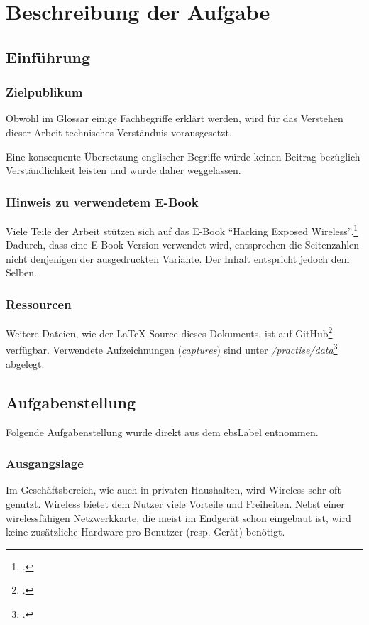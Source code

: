 \chapter{Beschreibung der Aufgabe}

\section{Einführung}
\subsection{Zielpublikum}
Obwohl im Glossar einige Fachbegriffe erklärt werden, wird für das Verstehen dieser Arbeit technisches Verständnis vorausgesetzt.

Eine konsequente Übersetzung englischer Begriffe würde keinen Beitrag bezüglich Verständlichkeit leisten und wurde daher weggelassen.

\subsection{Hinweis zu verwendetem E-Book}
Viele Teile der Arbeit stützen sich auf das E-Book "`Hacking Exposed Wireless"'.\footcite{WrightCache201503}
Dadurch, dass eine E-Book Version verwendet wird, entsprechen die Seitenzahlen nicht denjenigen der ausgedruckten Variante.
Der Inhalt entspricht jedoch dem Selben.

\subsection{Ressourcen}
Weitere Dateien, wie der \LaTeX-Source dieses Dokuments, ist auf GitHub\footcite{GitHub_wlan_seminar_2015-04-16} verfügbar.
Verwendete Aufzeichnungen (\textit{captures}) sind unter \textit{/practise/data}\footcite{GitHub_wlan_seminar_practise_data_2015-04-16} abgelegt.

\section{Aufgabenstellung}
Folgende Aufgabenstellung wurde direkt aus dem \gls{ebsLabel} entnommen.

\subsection{Ausgangslage}
Im Geschäftsbereich, wie auch in privaten Haushalten, wird Wireless sehr oft genutzt.
Wireless bietet dem Nutzer viele Vorteile und Freiheiten. Nebst einer wirelessfähigen Netzwerkkarte, die meist im Endgerät schon eingebaut ist, wird keine zusätzliche Hardware pro Benutzer (resp. Gerät) benötigt.


